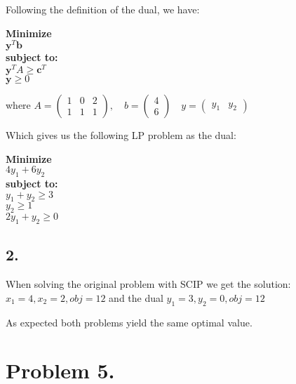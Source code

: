 \documentclass[12pt]{report}
\begin{document}
Following the definition of the dual, we have:

\textbf{Minimize}\\
  $\textbf{y}^T \textbf{b} $\\
\textbf{subject to:}\\
  $ \textbf{y}^T A \ge \textbf{c}^T $ \\
  $ \textbf{y} \ge 0 $ 

where $A = \left(
\begin{matrix}
  1 & 0 & 2 \\
  1 & 1 & 1 
\end{matrix}
\right),
\quad 
b = \left(
\begin{matrix}
  4 \\
  6 
\end{matrix}
\right)
\quad 
y = \left(
\begin{matrix}
  y_1 & y_2  
\end{matrix}
\right) $ 

Which gives us the following LP problem as the dual:

\textbf{Minimize}\\
  $ 4y_1 + 6y_2 $\\
\textbf{subject to:}\\
  $ y_1 + y_2  \ge 3 $ \\
  $ y_2        \ge 1 $ \\
  $ 2y_1 + y_2 \ge 0 $ 

\subsection*{2.}

When solving the original problem with SCIP we get the solution:
$ x_1 = 4, x_2 = 2, obj = 12$
and the dual
$ y_1 = 3, y_2 = 0, obj = 12$

As expected both problems yield the same optimal value.



\section*{Problem 5.}
\end{document}
